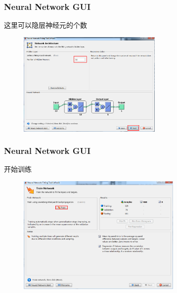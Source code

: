\documentclass[slidestop,compress,mathserif,c]{beamer}
\begin{document}
\begin{frame}
\frametitle{Neural Network GUI}
这里可以隐层神经元的个数
\begin{figure}
\centering
\includegraphics[width=7cm]{10}
\end{figure}


\end{frame}


\begin{frame}
\frametitle{Neural Network GUI}
开始训练
\begin{figure}
\centering
\includegraphics[width=8cm]{6}
\end{figure}


\end{frame}
\end{document}
